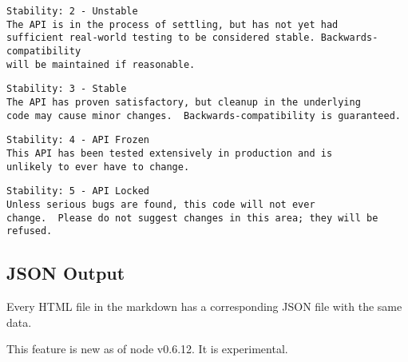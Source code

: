 \begin{verbatim}
Stability: 2 - Unstable
The API is in the process of settling, but has not yet had
sufficient real-world testing to be considered stable. Backwards-compatibility
will be maintained if reasonable.
\end{verbatim}

\begin{verbatim}
Stability: 3 - Stable
The API has proven satisfactory, but cleanup in the underlying
code may cause minor changes.  Backwards-compatibility is guaranteed.
\end{verbatim}

\begin{verbatim}
Stability: 4 - API Frozen
This API has been tested extensively in production and is
unlikely to ever have to change.
\end{verbatim}

\begin{verbatim}
Stability: 5 - API Locked
Unless serious bugs are found, this code will not ever
change.  Please do not suggest changes in this area; they will be refused.
\end{verbatim}

\subsection{JSON Output}

\begin{Shaded}
\begin{Highlighting}[]
\NormalTok{: } 
\end{Highlighting}
\end{Shaded}

Every HTML file in the markdown has a corresponding JSON file with the
same data.

This feature is new as of node v0.6.12. It is experimental.
